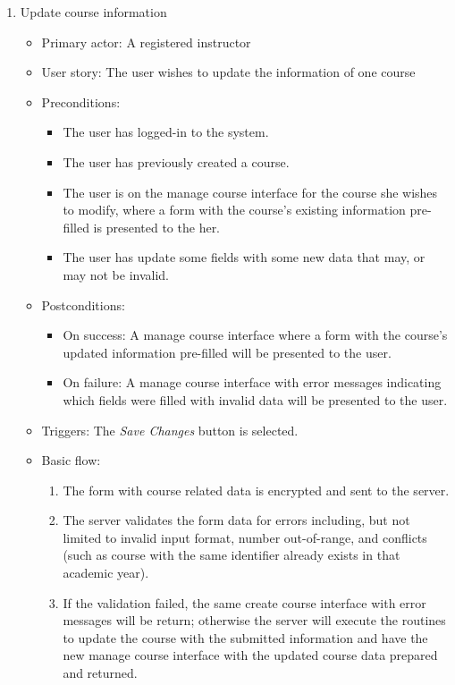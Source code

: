 \begin{enumerate}
\item Update course information
\begin{itemize}
    \item Primary actor: A registered instructor
    \item User story: The user wishes to update the information of one course
    \item Preconditions:
        \begin{itemize}
            \item The user has logged-in to the system.
            \item The user has previously created a course.
            \item The user is on the manage course interface for the course she
                wishes to modify, where a form with
                the course's existing information pre-filled is presented to
                the her.
            \item The user has update some fields with some new data that may,
                or may not be invalid.
        \end{itemize}
    \item Postconditions:
        \begin{itemize}
            \item On success: A manage course interface where a form with
                the course's updated information pre-filled will be presented
                to the user.
            \item On failure: A manage course interface with error messages
                indicating which fields were filled with invalid data will be
                presented to the user.
        \end{itemize}
    \item Triggers: The \emph{Save Changes} button is selected.
    \item Basic flow:
        \begin{enumerate}
            \item The form with course related data is encrypted and sent to
                the server.
            \item The server validates the form data for errors including,
                but not limited to invalid input format, number out-of-range,
                and conflicts (such as course with the same identifier  
                already exists in that academic year).
            \item If the validation failed, the same create course interface
                with error messages will be return; otherwise the server will
                execute the routines to update the course with the submitted 
                information and have the new manage course interface with the
                updated course data prepared and returned.
        \end{enumerate}
\end{itemize}


\end{enumerate}
